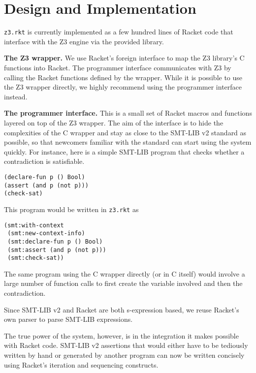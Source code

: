 \section{Design and Implementation}

\texttt{z3.rkt} is currently implemented as a few hundred lines of Racket code
that interface with the Z3 engine via the provided library.

\textbf{The Z3 wrapper.} We use Racket's foreign interface \cite{racket/foreign}
to map the Z3 library's C functions into Racket. The programmer interface
communicates with Z3 by calling the Racket functions defined by the
wrapper. While it is possible to use the Z3 wrapper directly, we highly
recommend using the programmer interface instead.

\textbf{The programmer interface.} This is a small set of Racket macros and
functions layered on top of the Z3 wrapper. The aim of the interface is to hide
the complexities of the C wrapper and stay as close to the SMT-LIB v2 standard
\cite{smtlib2:10} as possible, so that newcomers familiar with the standard can
start using the system quickly. For instance, here is a simple SMT-LIB program
that checks whether a contradiction is satisfiable.

\begin{verbatim}
(declare-fun p () Bool)
(assert (and p (not p)))
(check-sat)
\end{verbatim}

This program would be written in \texttt{z3.rkt} as

\begin{verbatim}
(smt:with-context
 (smt:new-context-info)
 (smt:declare-fun p () Bool)
 (smt:assert (and p (not p)))
 (smt:check-sat))
\end{verbatim}

The same program using the C wrapper directly (or in C itself) would involve a
large number of function calls to first create the variable involved and then
the contradiction.

Since SMT-LIB v2 and Racket are both s-expression based, we reuse Racket's own
parser to parse SMT-LIB expressions.

The true power of the system, however, is in the integration it makes possible
with Racket code. SMT-LIB v2 assertions that would either have to be tediously
written by hand or generated by another program can now be written concisely
using Racket's iteration and sequencing constructs.
